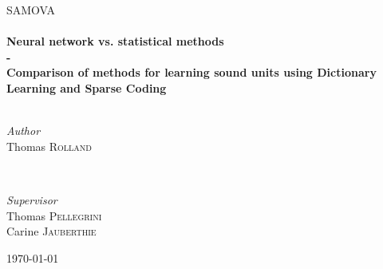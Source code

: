 \documentclass[a4paper,10pt]{article}
\begin{document}
\begin{titlepage}
	\textsc{\large SAMOVA}\\[0.5cm] %
	
	
	\HRule\\[0.4cm]
	
	{\huge\bfseries Neural network vs. statistical methods
\\ \vspace{0.5cm}- \vspace{0.5cm} \\  Comparison of methods for learning sound units using Dictionary Learning and Sparse Coding}\\[0.4cm] %
	
	\HRule\\[1.5cm]
	
	
	\begin{minipage}{0.4\textwidth}
		\begin{flushleft}
			\large
			\textit{Author}\\
			Thomas \textsc{Rolland} %
		\end{flushleft}
	\end{minipage}
	~
	\begin{minipage}{0.4\textwidth}
		\begin{flushright}
			\large
			\textit{Supervisor}\\
			Thomas \textsc{Pellegrini}\\ %
            Carine \textsc{Jauberthie}
		\end{flushright}
	\end{minipage}
	
	
	
	\vfill\vfill\vfill %
	
	{\large\today} %
	

	
	\vfill %
	
\end{titlepage}
\end{document}
